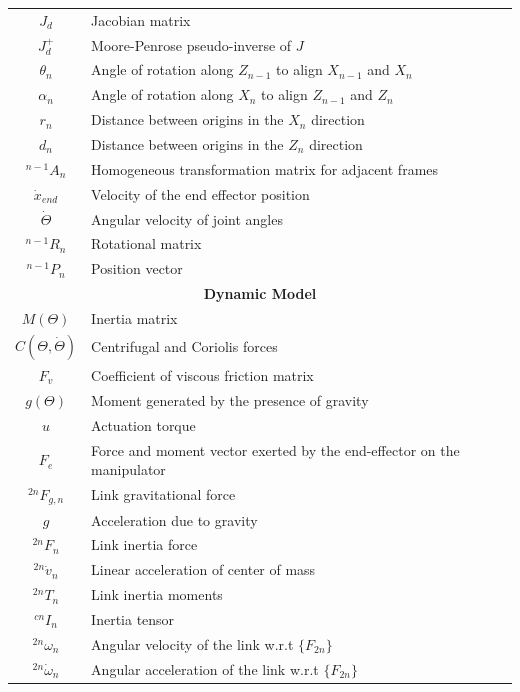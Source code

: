 \documentclass[a4paper,12pt]{report}
\begin{document}
\begin{appendices}
\begin{center}
\begin{longtable}{|c|p{12cm}|}
			$J_{d}$ & Jacobian matrix\\
			$J_{d}^{+}$ & Moore-Penrose pseudo-inverse of $J$\\
			
			$\theta_{n}$ & Angle of rotation along $Z_{n-1}$ to align $X_{n-1}$ and $X_{n}$  \\
			$\alpha_{n}$ &Angle of rotation along $X_{n}$ to align $Z_{n-1}$ and $Z_{n}$ \\
			$r_n$ & Distance between origins in the $X_{n}$ direction\\
			$d_n$ & Distance between origins in the $Z_{n}$ direction\\
			
			$^{n-1} A_{n}$ & Homogeneous transformation matrix for adjacent frames\\
			$\dot{x}_{end}$ & Velocity of the end effector position\\
			
			
			$\dot{\Theta}$ & Angular velocity of joint angles\\
			$^{n-1} R_{n}$ & Rotational matrix\\
			$^{n-1} P_{n}$ & Position vector\\
			
			\hline
			\multicolumn{2}{|c|}{\textbf{Dynamic Model}} \\
			\hline
			
			$M(\Theta)$ & Inertia matrix\\
			$C(\Theta,\dot{\Theta})$ & Centrifugal and Coriolis forces\\
			$F_v$ & Coefficient of viscous friction matrix\\
			$g(\Theta)$ & Moment generated by the presence of gravity \\
			$u$ & Actuation torque \\
			$F_e$ & Force and moment vector exerted by the end-effector on the manipulator \\
			
			$^{2n}F_{g,n}$ & Link gravitational force\\
			$g$ & Acceleration due to gravity\\
			
			$^{2 n}F_{n}$ & Link inertia force\\
			$^{2 n}\dot{v}_{n}$ & Linear acceleration of center of mass\\
			
			$^{2 n}T_{n}$ & Link inertia moments\\
			$^{c n}I_{n}$ & Inertia tensor\\
			$^{2 n}\omega_{n}$ & Angular velocity of the link w.r.t $\{F_{2n}\}$\\
			$^{2 n}\dot{\omega}_{n}$ & Angular acceleration of the link w.r.t $\{F_{2n}\}$\\
			

\end{longtable}
\end{center}
\end{appendices}
\end{document}

